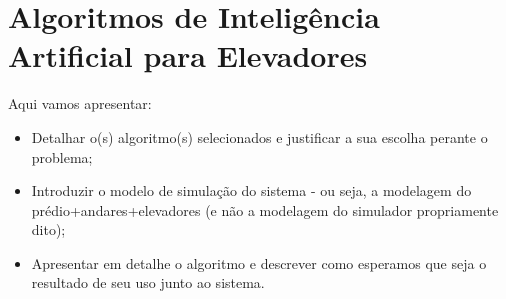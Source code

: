 \chapter{\label{chap:ai}Algoritmos de Inteligência Artificial para Elevadores}

Aqui vamos apresentar:

\begin{itemize}
\item Detalhar o(s) algoritmo(s) selecionados e justificar a sua escolha perante o problema;
\item Introduzir o modelo de simulação do sistema - ou seja, a modelagem do
prédio+andares+elevadores (e não a modelagem do simulador propriamente dito);
\item Apresentar em detalhe o algoritmo e descrever como esperamos que seja o resultado de seu uso junto ao sistema.
\end{itemize}